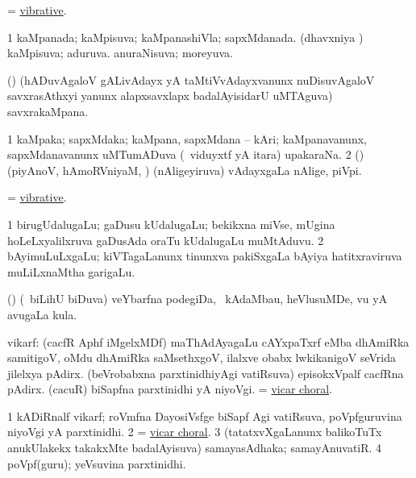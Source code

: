 \bentry
{} 
\gl{\gu}
\expl{}
\bmng
 = \hyperlink{vibrative}{vibrative}. 
\emng
\eentry

\bentry
{} 
\gl{\gu}
\expl{}
\bmng
\bnum
\num{1} kaMpanada; kaMpisuva; kaMpanashiVla; sapxMdanada. 
 (dhavxniya \vi) 
\banum
{} kaMpisuva; aduruva. 
 anuraNisuva; moreyuva. 
\eanum
\numie
\enum
\emng
\eentry

\bentry
{} 
\gl{\nA}
\bmng
 (\saM) (hADuvAgaloV gALivAdayx yA taMtiVvAdayxvanunx nuDisuvAgaloV savxrasAthxyi yanunx alapxsavxlapx badalAyisidarU uMTAguva) savxrakaMpana. 
\emng
\eentry

\bentry
{} 
\gl{\nA}
\expl{}
\bmng
\bnum
\num{1} kaMpaka; sapxMdaka; kaMpana, sapxMdana -- kAri; kaMpanavanunx, sapxMdanavanunx uMTumADuva (\kanmu\ viduyxtf yA itara) upakaraNa. 
\num{2} (\saM) (piyAnoV, hAmoRVniyaM, \mo) (nAligeyiruva) vAdayxgaLa nAlige, piVpi. 
\enum
\emng
\eentry

\bentry
{} 
\gl{\gu}
\expl{}
\bmng
 = \hyperlink{vibrative}{vibrative}. 
\emng
\eentry

\bentry
{} 
\gl{\nA}
\expl{(\bava)}
\bmng
\bnum
\num{1} birugUdalugaLu; gaDusu kUdalugaLu; bekikxna miVse, mUgina hoLeLxyalilxruva gaDusAda oraTu kUdalugaLu muMtAduvu. 
\num{2} bAyimuLuLxgaLu; kiVTagaLanunx tinunxva pakiSxgaLa bAyiya hatitxraviruva muLiLxnaMtha garigaLu. 
\enum
\emng
\eentry

\bentry
{} 
\gl{\nA}
\expl{}
\bmng
 (\savi) (\sA\ biLihU biDuva) veYbarfna podegiDa, \udA\ kAdaMbau, heVlusuMDe, \mo vu yA avugaLa kula. 
\emng
\eentry

\bentry
{}
\gl{\saMkiSx}
\expl{}
\bmng
\emng
\eentry

\bentry
{} 
\gl{\nA}
\expl{}
\bmng
 vikarf: 
\banum
{} (cacfR Aphf iMgelxMDf) maThAdAyagaLu cAYxpaTxrf eMba dhAmiRka samitigoV, oMdu dhAmiRka saMsethxgoV, ilalxve obabx lwkikanigoV seVrida jilelxya pAdirx. 
 (beVrobabxna parxtinidhiyAgi vatiRsuva) episokxVpalf cacfRna pAdirx. 
 (\roVkAyx cacuR) biSapfna parxtinidhi yA niyoVgi. 
 = \hyperlink{vicar choral}{vicar choral}. 
\eanum
\emng

\noindent
\gl{\pagu}
\expl{}
\bmng
\bnum
\num{1} kADiRnalf vikarf; roVmfna DayosiVsfge biSapf Agi vatiRsuva, poVpfguruvina niyoVgi yA parxtinidhi. 
\num{2}  = \hyperlink{vicar choral}{vicar choral}. 
\num{3}  (tatatxvXgaLanunx balikoTuTx anukUlakekx takakxMte badalAyisuva) samayasAdhaka; samayAnuvatiR. 
\num{4}  poVpf(guru); yeVsuvina parxtinidhi. 
\enum
\emng
\eentry

